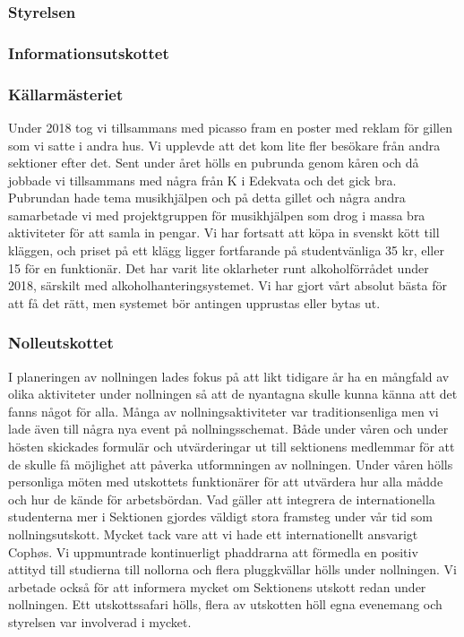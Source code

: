\documentclass[../_main/handlingar.tex]{subfiles}
\begin{document}

\subsubsection*{Styrelsen}

\subsubsection*{Informationsutskottet}

\subsubsection*{Källarmästeriet}

Under 2018 tog vi tillsammans med picasso fram en poster med reklam för gillen som vi satte i andra
hus. Vi upplevde att det kom lite fler besökare från andra sektioner efter det. Sent under året hölls
en pubrunda genom kåren och då jobbade vi tillsammans med några från K i Edekvata och det gick
bra. Pubrundan hade tema musikhjälpen och på detta gillet och några andra samarbetade vi med
projektgruppen för musikhjälpen som drog i massa bra aktiviteter för att samla in pengar.
Vi har fortsatt att köpa in svenskt kött till kläggen, och priset på ett klägg ligger fortfarande på
studentvänliga 35 kr, eller 15 för en funktionär.
Det har varit lite oklarheter runt alkoholförrådet under 2018, särskilt med alkoholhanteringsystemet.
Vi har gjort vårt absolut bästa för att få det rätt, men systemet bör antingen upprustas eller bytas ut.


\subsubsection*{Nolleutskottet}

I planeringen av nollningen lades fokus på att likt tidigare år ha en mångfald av olika aktiviteter under
nollningen så att de nyantagna skulle kunna känna att det fanns något för alla. Många av
nollningsaktiviteter var traditionsenliga men vi lade även till några nya event på nollningsschemat.
Både under våren och under hösten skickades formulär och utvärderingar ut till sektionens
medlemmar för att de skulle få möjlighet att påverka utformningen av nollningen. Under våren hölls
personliga möten med utskottets funktionärer för att utvärdera hur alla mådde och hur de kände för
arbetsbördan.
Vad gäller att integrera de internationella studenterna mer i Sektionen gjordes väldigt stora framsteg
under vår tid som nollningsutskott. Mycket tack vare att vi hade ett internationellt ansvarigt Cophøs.
Vi uppmuntrade kontinuerligt phaddrarna att förmedla en positiv attityd till studierna till nollorna
och flera pluggkvällar hölls under nollningen. Vi arbetade också för att informera mycket om
Sektionens utskott redan under nollningen. Ett utskottssafari hölls, flera av utskotten höll egna
evenemang och styrelsen var involverad i mycket.
\end{document}
